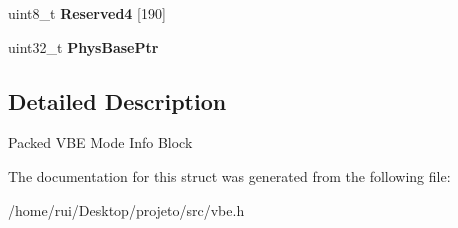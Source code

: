 \begin{DoxyCompactItemize}
\item 
uint8\+\_\+t {\bfseries Reserved4} \mbox{[}190\mbox{]}\hypertarget{struct____attribute_____ab859fb715f83f005dfa2f13d8b0e4ff0}{}\label{struct____attribute_____ab859fb715f83f005dfa2f13d8b0e4ff0}

\item 
uint32\+\_\+t {\bfseries Phys\+Base\+Ptr}\hypertarget{struct____attribute_____a688c7ff612f59a801419bd9f46e8d7d7}{}\label{struct____attribute_____a688c7ff612f59a801419bd9f46e8d7d7}

\end{DoxyCompactItemize}


\subsection{Detailed Description}
Packed V\+BE Mode Info Block 

The documentation for this struct was generated from the following file\+:\begin{DoxyCompactItemize}
\item 
/home/rui/\+Desktop/projeto/src/vbe.\+h\end{DoxyCompactItemize}
